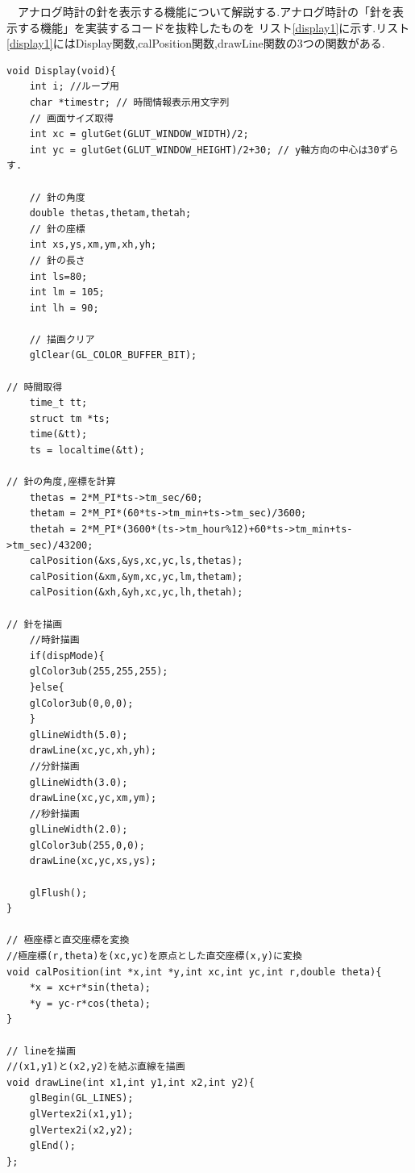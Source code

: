\documentclass[a4j]{jarticle}
\begin{document}
    　アナログ時計の針を表示する機能について解説する.アナログ時計の「針を表示する機能」を実装するコードを抜粋したものを
    リスト\ref{display1}に示す.リスト\ref{display1}にはDisplay関数,calPosition関数,drawLine関数の3つの関数がある.
    \begin{lstlisting}[basicstyle=\ttfamily\footnotesize, frame=single,label=display1,caption=針の描画の実装]
void Display(void){
    int i; //ループ用
    char *timestr; // 時間情報表示用文字列    
    // 画面サイズ取得
    int xc = glutGet(GLUT_WINDOW_WIDTH)/2;
    int yc = glutGet(GLUT_WINDOW_HEIGHT)/2+30; // y軸方向の中心は30ずらす.

    // 針の角度
    double thetas,thetam,thetah;
    // 針の座標
    int xs,ys,xm,ym,xh,yh;
    // 針の長さ
    int ls=80;
    int lm = 105;
    int lh = 90; 

    // 描画クリア
    glClear(GL_COLOR_BUFFER_BIT);
    
// 時間取得
    time_t tt;
    struct tm *ts;
    time(&tt);
    ts = localtime(&tt);

// 針の角度,座標を計算
    thetas = 2*M_PI*ts->tm_sec/60;
    thetam = 2*M_PI*(60*ts->tm_min+ts->tm_sec)/3600;
    thetah = 2*M_PI*(3600*(ts->tm_hour%12)+60*ts->tm_min+ts->tm_sec)/43200;
    calPosition(&xs,&ys,xc,yc,ls,thetas);
    calPosition(&xm,&ym,xc,yc,lm,thetam);
    calPosition(&xh,&yh,xc,yc,lh,thetah);

// 針を描画
    //時針描画
    if(dispMode){
    glColor3ub(255,255,255);
    }else{
    glColor3ub(0,0,0);
    }
    glLineWidth(5.0);
    drawLine(xc,yc,xh,yh);
    //分針描画
    glLineWidth(3.0);
    drawLine(xc,yc,xm,ym);
    //秒針描画
    glLineWidth(2.0);
    glColor3ub(255,0,0);
    drawLine(xc,yc,xs,ys);

    glFlush();
}

// 極座標と直交座標を変換
//極座標(r,theta)を(xc,yc)を原点とした直交座標(x,y)に変換
void calPosition(int *x,int *y,int xc,int yc,int r,double theta){
    *x = xc+r*sin(theta);
    *y = yc-r*cos(theta);
}

// lineを描画
//(x1,y1)と(x2,y2)を結ぶ直線を描画
void drawLine(int x1,int y1,int x2,int y2){
    glBegin(GL_LINES);
    glVertex2i(x1,y1);
    glVertex2i(x2,y2);
    glEnd();
};
            \end{lstlisting}
    
\end{document}
